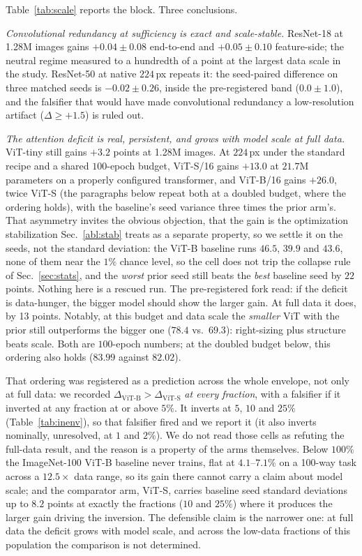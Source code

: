 Table~\ref{tab:scale} reports the block. Three conclusions.

\emph{Convolutional redundancy at sufficiency is exact and scale-stable.}
ResNet-18 at 1.28M images gains $+0.04 \pm 0.08$ end-to-end and $+0.05 \pm
0.10$ feature-side; the neutral regime measured to a hundredth of a point at
the largest data scale in the study. ResNet-50 at native $224$\,px repeats it:
the seed-paired difference on three matched seeds is $-0.02
\pm 0.26$, inside the pre-registered band ($0.0 \pm 1.0$), and the falsifier
that would have made convolutional redundancy
a low-resolution artifact ($\Delta \geq +1.5$) is ruled out.

\emph{The attention deficit is real, persistent, and grows with model scale at
full data.} ViT-tiny still gains $+3.2$ points at 1.28M images. At $224$\,px
under the standard recipe and a shared $100$-epoch budget, ViT-S/16 gains
$+13.0$ at $21.7$M parameters on a properly configured transformer, and
ViT-B/16 gains $+26.0$, twice ViT-S (the paragraphs below repeat both at a
doubled budget, where the ordering holds),
with the baseline's seed
variance three times the prior arm's. That asymmetry invites the obvious
objection, that the gain is the optimization stabilization
Sec.~\ref{abl:stab} treats as a separate property, so we settle it on the
seeds, not the standard deviation: the ViT-B baseline runs $46.5$, $39.9$ and
$43.6$, none of them near the $1\%$ chance level, so the cell does not trip the
collapse rule of Sec.~\ref{sec:stats}, and the \emph{worst} prior seed still
beats the \emph{best} baseline seed by $22$ points. Nothing here is a rescued
run. The pre-registered fork read: if the deficit is data-hunger, the bigger
model should show the larger gain. At full data it does, by 13 points. Notably,
at this budget and data scale the \emph{smaller} ViT with the prior still
outperforms the bigger one ($78.4$ vs.\ $69.3$): right-sizing plus structure
beats scale. Both are $100$-epoch numbers; at the doubled budget below, this
ordering also holds ($83.99$ against $82.02$).

 That ordering was registered as a prediction across the whole envelope, not
only at full data: we recorded $\Delta_{\mathrm{ViT\text{-}B}} >
\Delta_{\mathrm{ViT\text{-}S}}$ \emph{at every fraction}, with a falsifier if
it inverted at any fraction at or above $5\%$. It inverts at $5$, $10$ and
$25\%$ (Table~\ref{tab:inenv}), so that falsifier fired and we report it (it
also inverts nominally, unresolved, at $1$ and $2\%$). We do
not read those cells as refuting the full-data result, and the reason is a
property of the arms themselves. Below $100\%$ the ImageNet-100 ViT-B baseline
never trains, flat at $4.1$--$7.1\%$ on a 100-way task across a $12.5\times$
data range, so its gain there cannot carry a claim about model scale; and the
comparator arm, ViT-S, carries baseline seed standard deviations up to $8.2$
points at exactly the fractions ($10$ and $25\%$) where it produces the
larger gain driving the inversion. The defensible claim is
the narrower one: at full data the deficit
grows with model scale, and across the low-data fractions of this population
the comparison is not determined.

